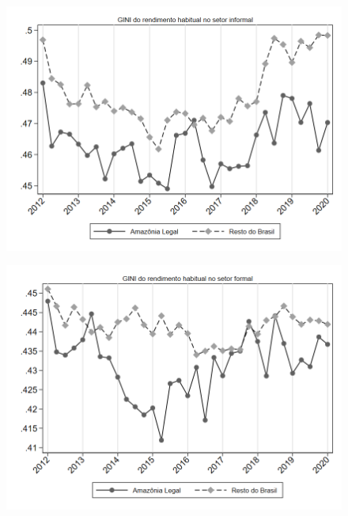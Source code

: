 \begin{frame}[label=_estrutura_renda_gini_informal]{}
\textit{\hyperlink{_estrutura_renda}{}}
\begin{figure}
  \centering
  \includegraphics[width=1.0\linewidth]{../../analysis/output/estrutura_renda/_estrutura_renda_gini_informal.png}
  \caption{}
  \label{fig:_estrutura_renda_gini_informal}
\end{figure}
\end{frame}


\begin{frame}[label=_estrutura_renda_gini_formal]{}
\textit{\hyperlink{_estrutura_renda}{}}
\begin{figure}
  \centering
  \includegraphics[width=1.0\linewidth]{../../analysis/output/estrutura_renda/_estrutura_renda_gini_formal.png}
  \caption{}
  \label{fig:_estrutura_renda_gini_formal}
\end{figure}
\end{frame}
